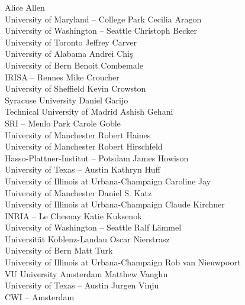 \documentclass[a4paper,UKenglish]{dagman}
\begin{document}
\begin{participants}
\participant Alice Allen\\ University of Maryland -- College Park
\participant Cecilia Aragon\\ University of Washington -- Seattle
\participant Christoph Becker\\ University of Toronto
\participant Jeffrey Carver\\ University of Alabama
\participant Andrei Chi\c{s}\\ University of Bern
\participant Benoit Combemale\\ IRISA -- Rennes
\participant Mike Croucher\\ University of Sheffield
\participant Kevin Crowston\\ Syracuse University
\participant Daniel Garijo\\ Technical University of Madrid
\participant Ashish Gehani\\ SRI -- Menlo Park
\participant Carole Goble\\ University of Manchester
\participant Robert Haines\\ University of Manchester
\participant Robert Hirschfeld\\ Hasso-Plattner-Institut -- Potsdam
\participant James Howison\\ University of Texas -- Austin
\participant Kathryn Huff\\ University of Illinois at Urbana-Champaign
\participant Caroline Jay\\ University of Manchester
\participant Daniel S. Katz\\ University of Illinois at Urbana-Champaign
\participant Claude Kirchner\\ INRIA -- Le Chesnay
\participant Katie Kuksenok\\ University of Washington -- Seattle
\participant Ralf L\"ammel\\ Universit\"at Koblenz-Landau
\participant Oscar Nierstrasz\\ University of Bern
\participant Matt Turk\\ University of Illinois at Urbana-Champaign
\participant Rob van Nieuwpoort\\ VU University Amsterdam
\participant Matthew Vaughn\\ University of Texas -- Austin
\participant Jurgen Vinju\\ CWI -- Amsterdam
\end{participants}
\end{document}
